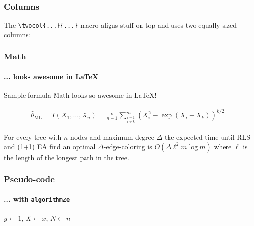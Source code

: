 \documentclass[t,english]{beamer}
\begin{document}
\begin{frame}[fragile]
  \frametitle{Columns}

  The \verb|\twocol{...}{...}|-macro aligns stuff on top and uses two equally sized columns:
\end{frame}



\begin{frame}
  \frametitle{Math}
  \framesubtitle{... looks awesome in \LaTeX{}}

  \begin{block}{Sample formula}
    Math looks so \alert<2->{awesome} in \LaTeX{}!

    \begin{align*}
      \hat{\theta}_{\text{ML}} = T(X_1, \ldots, X_n) = \frac{n}{n-1} \sum_{\frac{i=1}{i \neq k}}^{m} \left(X_i^2 - \exp(X_i - X_k)\right)^{k/2}
    \end{align*}
  \end{block}

  \begin{theorem}
    For every tree with $n$ nodes and maximum degree $\Delta$ the expected time until RLS and (1+1) EA find an optimal $\Delta$-edge-coloring is $O(\Delta \ell^2 m \log m)$ where $\ell$ is the length of the longest path in the tree.
  \end{theorem}
\end{frame}



\begin{frame}[fragile]
  \frametitle{Pseudo-code}
  \framesubtitle{... with \texttt{algorithm2e}}

  \begin{algorithm}[H]
  \caption{Sample algorithm (taken from Overleaf docs)}\label{alg:sample_algorithm}
  $y \gets 1$, $X \gets x$, $N \gets n$\;
  \end{algorithm}

\end{frame}
\end{document}
